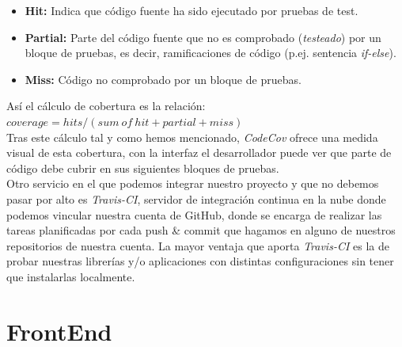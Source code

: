 \documentclass[a4paper, 12pt]{book}
\begin{document}
\begin{itemize}
    \item \textbf{Hit: } Indica que código fuente ha sido ejecutado por pruebas de test.
    \item \textbf{Partial: } Parte del código fuente que no es comprobado (\emph{testeado}) por un bloque de pruebas, es decir, ramificaciones de código (p.ej. sentencia \emph{if-else}).
    \item \textbf{Miss: } Código no comprobado por un bloque de pruebas.
\end{itemize}
Así el cálculo de cobertura es la relación: $coverage = hits / (sum\ of\ hit + partial + miss)$ \\
Tras este cálculo tal y como hemos mencionado, \emph{CodeCov} ofrece una medida visual de esta cobertura, con la interfaz el desarrollador puede ver que parte de código debe cubrir en sus siguientes bloques de pruebas. \\
Otro servicio en el que podemos integrar nuestro proyecto y que no debemos pasar por alto es \emph{Travis-CI}, servidor de integración continua en la nube donde podemos vincular nuestra cuenta de GitHub, donde se encarga de realizar las tareas planificadas por cada push & commit que hagamos en alguno de nuestros repositorios de nuestra cuenta. La mayor ventaja que aporta \emph{Travis-CI} es la de probar nuestras librerías y/o aplicaciones con distintas configuraciones sin tener que instalarlas localmente. 
\section{FrontEnd}
\label{sec:frontEnd}
\end{document}
